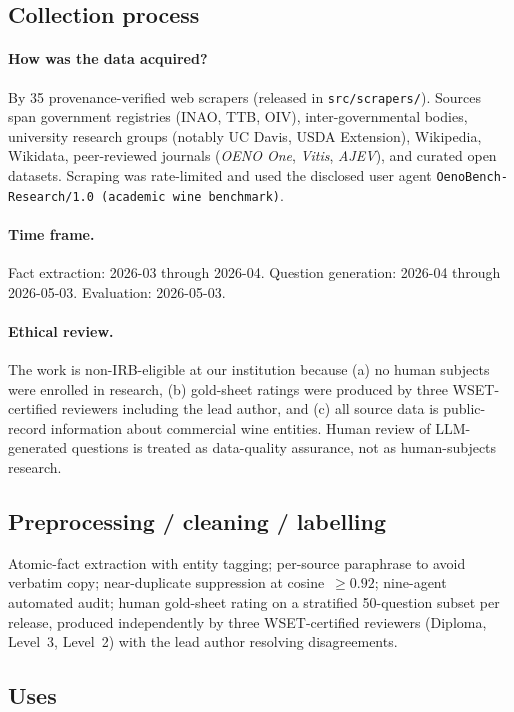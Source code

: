 \subsection{Collection process}
\paragraph{How was the data acquired?}
By 35 provenance-verified web scrapers (released in
\texttt{src/scrapers/}). Sources span government registries (INAO,
TTB, OIV), inter-governmental bodies, university research groups
(notably UC Davis, USDA Extension), Wikipedia, Wikidata, peer-reviewed
journals (\emph{OENO One}, \emph{Vitis}, \emph{AJEV}), and curated
open datasets. Scraping was rate-limited and used the disclosed user
agent \texttt{OenoBench-Research/1.0 (academic wine benchmark)}.

\paragraph{Time frame.}
Fact extraction: 2026-03 through 2026-04. Question generation:
2026-04 through 2026-05-03. Evaluation: 2026-05-03.

\paragraph{Ethical review.}
The work is non-IRB-eligible at our institution because (a) no human
subjects were enrolled in research, (b) gold-sheet ratings were produced by
three WSET-certified reviewers including the lead author, and (c) all
source data is public-record information about commercial wine entities.
Human review of LLM-generated questions is treated as data-quality
assurance, not as human-subjects research.

\subsection{Preprocessing / cleaning / labelling}
Atomic-fact extraction with entity tagging; per-source paraphrase to
avoid verbatim copy; near-duplicate suppression at cosine~$\geq 0.92$;
nine-agent automated audit; human gold-sheet rating on a stratified
50-question subset per release, produced independently by three
WSET-certified reviewers (Diploma, Level~3, Level~2) with the lead
author resolving disagreements.

\subsection{Uses}
